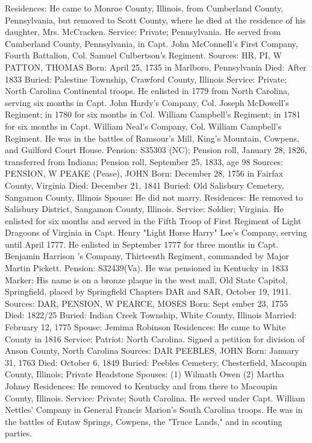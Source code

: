 Residences: He came to Monroe County, Illinois, from Cumberland County, Pennsylvania, but removed to Scott County, where he died at the residence of his daughter, Mrs. McCracken. 
Service: Private; Pennsylvania. He served from Cumberland County, Pennsyl­vania, in Capt. John McConneIl's First Company, Fourth Battalion, Col. Samuel Culbertson's Regiment. 
Sources: HR, PI, W 
PATTON, THOMAS 
Born: April 25, 1735 in Marlboro, Pennsylvania
Died: After 1833
Buried: Palestine Township, Crawford County, Illinois 
Service: Private; North Carolina Continental troops. He enlisted in 1779 from North Carolina, serving six months in Capt. John Hardy's Company, Col. Joseph McDowell's Regiment; in 1780 for six months in Col. William Camp­bell's Regiment; in 1781 for six months in Capt. William Neal's Company, Col. William Campbell's Regiment. He was in the battles of Ramsour's Mill, King's Mountain, Cowpens, and Guilford Court House. 
Pension: S35303 (NC); Pension roll, January 28, 1826, transferred from Indiana; Pension roll, September 25, 1833, age 98 
Sources: PENSION, W 
PEAKE (Pease), JOHN 
Born: December 28, 1756 in Fairfax County, Virginia 
Died: December 21, 1841 
Buried: Old Salisbury Cemetery, Sangamon County, Illinois 
Spouse: He did not marry. 
Residences: He removed to Salisbury District, Sangamon County, Illinois. 
Service: Soldier; Virginia. He enlisted for six months and served in the Fifth Troop of First Regiment of Light Dragoons of Virginia in Capt. Henry "Light Horse Harry" Lee's Company, serving until April 1777. He enlisted in September 1777 for three months in Capt. Benjamin Harrison 's Company, Thirteenth Regiment, commanded by Major Martin Pickett. 
Pension: S32439(Va). He was pensioned in Kentucky in 1833
Marker: His name is on a bronze plaque in the west mall, Old State Capitol, Springfield, placed by Springfield Chapters DAR and SAR, October 19, 1911. 
Sources: DAR, PENSION, W 
PEARCE, MOSES 
Born: Sept ember 23, 1755 
Died: 1822/25 
Buried: Indian Creek Township, White County, Illinois 
Married: February 12, 1775 
Spouse: Jemima Robinson
Residences: He came to White County in 1816
Service: Patriot: North Carolina. Signed a petition for division of Anson County, North Carolina
Sources: DAR 
PEEBLES, JOHN 
Born: January 31, 1763 
Died: October 6, 1849 
Buried: Peebles Cemetery, Chesterfield, Macoupin County, Illinois; Private Head­stone 
Spouses: 		(1) Wilmath Owen 
(2) Martha Johnsy 
Residences:  He removed to Kentucky and from there to Macoupin County, Illinois. 
Service: Private; South Carolina. He served under Capt. William Nettles' Com­pany in General Francis Marion's South Carolina troops. He was in the battles of Eutaw Springs, Cowpens, the "Truce Lands," and in scouting parties. 
